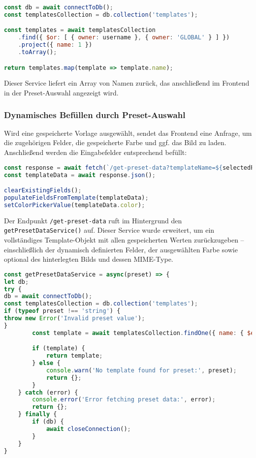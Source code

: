 \begin{lstlisting}[language=JavaScript, caption=Service zum Abrufen von Template-Namen]
const db = await connectToDb();
const templatesCollection = db.collection('templates');

const templates = await templatesCollection
    .find({ $or: [ { owner: username }, { owner: 'GLOBAL' } ] })
    .project({ name: 1 })
    .toArray();

return templates.map(template => template.name);
\end{lstlisting}

Dieser Service liefert ein Array von Namen zurück, das anschließend im Frontend in der Preset-Auswahl angezeigt wird.

\subsubsection{Dynamisches Befüllen durch Preset-Auswahl}\label{subsubsec:load-template-data}

Wird eine gespeicherte Vorlage ausgewählt, sendet das Frontend eine Anfrage, um die zugehörigen Felder, die gespeicherte Farbe und ggf. das Bild zu laden.
Anschließend werden die Eingabefelder entsprechend befüllt:

\begin{lstlisting}[language=JavaScript, caption=Preset-Auswahl lädt Felder und Bild]
const response = await fetch(`/get-preset-data?templateName=${selectedPreset}`);
const templateData = await response.json();

clearExistingFields();
populateFieldsFromTemplate(templateData);
setColorPickerValue(templateData.color);
\end{lstlisting}

Der Endpunkt \texttt{/get-preset-data} ruft im Hintergrund den \texttt{getPresetDataService()} auf.
Dieser Service wurde erweitert, um ein vollständiges Template-Objekt mit allen gespeicherten Werten zurückzugeben – einschließlich der dynamisch definierten Felder, der ausgewählten Farbe sowie optional des hinterlegten Bilds und dessen MIME-Type.

\begin{lstlisting}[language=JavaScript, caption=Service zum Laden eines Templates]
const getPresetDataService = async(preset) => {
let db;
try {
db = await connectToDb();
const templatesCollection = db.collection('templates');
if (typeof preset !== 'string') {
throw new Error('Invalid preset value');
}
        const template = await templatesCollection.findOne({ name: { $eq: preset } });

        if (template) {
            return template;
        } else {
            console.warn('No template found for preset:', preset);
            return {};
        }
    } catch (error) {
        console.error('Error fetching preset data:', error);
        return {};
    } finally {
        if (db) {
            await closeConnection();
        }
    }
}
\end{lstlisting}

